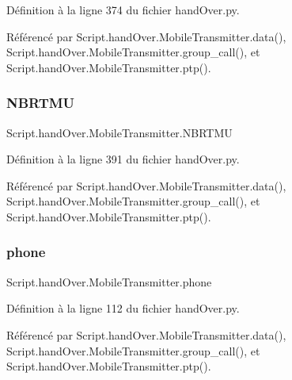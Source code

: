 Définition à la ligne 374 du fichier hand\+Over.\+py.



Référencé par Script.\+hand\+Over.\+Mobile\+Transmitter.\+data(), Script.\+hand\+Over.\+Mobile\+Transmitter.\+group\+\_\+call(), et Script.\+hand\+Over.\+Mobile\+Transmitter.\+ptp().

\mbox{\label{classScript_1_1handOver_1_1MobileTransmitter_a3af626813f1fb97a4dfbd264f032fcc8}} 
\subsubsection{\texorpdfstring{N\+B\+R\+T\+MU}{NBRTMU}}
{\footnotesize\ttfamily Script.\+hand\+Over.\+Mobile\+Transmitter.\+N\+B\+R\+T\+MU}



Définition à la ligne 391 du fichier hand\+Over.\+py.



Référencé par Script.\+hand\+Over.\+Mobile\+Transmitter.\+data(), Script.\+hand\+Over.\+Mobile\+Transmitter.\+group\+\_\+call(), et Script.\+hand\+Over.\+Mobile\+Transmitter.\+ptp().

\mbox{\label{classScript_1_1handOver_1_1MobileTransmitter_a866608c9e27a57c84cea03fc1de1696f}} 
\subsubsection{\texorpdfstring{phone}{phone}}
{\footnotesize\ttfamily Script.\+hand\+Over.\+Mobile\+Transmitter.\+phone}



Définition à la ligne 112 du fichier hand\+Over.\+py.



Référencé par Script.\+hand\+Over.\+Mobile\+Transmitter.\+data(), Script.\+hand\+Over.\+Mobile\+Transmitter.\+group\+\_\+call(), et Script.\+hand\+Over.\+Mobile\+Transmitter.\+ptp().

